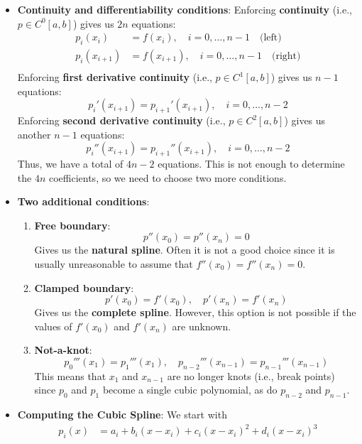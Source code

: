 \documentclass{report}
\begin{document}
\begin{itemize}
        \item \textbf{Continuity and differentiability conditions}:
            Enforcing \textbf{continuity} (i.e., $p \in C^0[a,b]$) gives us $2n$ equations:
            \begin{align*}
                p_i(x_i) &= f(x_i), \quad i = 0, \dots, n-1 \quad \text{(left)}\\
                p_i(x_{i+1}) &= f(x_{i+1}), \quad i = 0, \dots, n-1 \quad \text{(right)}\\
            \end{align*}
            Enforcing \textbf{first derivative continuity} (i.e., $p \in C^1[a,b]$) gives us $n-1$ equations:
            $$
            p_i'(x_{i+1}) = p_{i+1}'(x_{i+1}), \quad i = 0, \dots, n-2
            $$
            Enforcing \textbf{second derivative continuity} (i.e., $p \in C^2[a,b]$) gives us another $n-1$ equations:
            $$
            p_i''(x_{i+1}) = p_{i+1}''(x_{i+1}), \quad i = 0, \dots, n-2
            $$
            Thus, we have a total of $4n - 2$ equations. This is not enough to determine the $4n$ coefficients, so we need to choose two more conditions.
        \item \textbf{Two additional conditions}:
            \begin{enumerate}
                \item \textbf{Free boundary}:
                    $$p''(x_0) = p''(x_n) = 0$$
                    Gives us the \textbf{natural spline}. Often it is not a good choice since it is usually unreasonable to assume that $f''(x_0) = f''(x_n) = 0$.
                \item \textbf{Clamped boundary}:
                    $$p'(x_0) = f'(x_0), \quad p'(x_n) = f'(x_n)$$
                    Gives us the \textbf{complete spline}. However, this option is not possible if the values of $f'(x_0)$ and $f'(x_n)$ are unknown.
                \item \textbf{Not-a-knot}:
                    $$p_0'''(x_1) = p_1'''(x_1), \quad p_{n-2}'''(x_{n-1}) = p_{n-1}'''(x_{n-1})$$
                    This means that $x_1$ and $x_{n-1}$ are no longer knots (i.e., break points) since $p_0$ and $p_1$ become a single cubic polynomial, as do $p_{n-2}$ and $p_{n-1}$.
            \end{enumerate}
        \item \textbf{Computing the Cubic Spline}:
            We start with
            \begin{align*}
                p_i(x) &= a_i + b_i(x-x_i) + c_i(x-x_i)^2 + d_i(x-x_i)^3\\

\end{align*}
\end{itemize}
\end{document}
